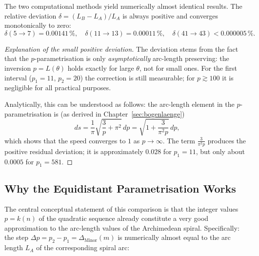 \begin{proposition}
\label{prop:methoden_uebereinstimmung}
The two computational methods yield numerically almost identical results.
The relative deviation $\delta = (L_B - L_A)/L_A$ is always positive and converges
monotonically to zero:
\[
\delta(5 \to 7) = 0.00141\,\%,\quad
\delta(11 \to 13) = 0.00011\,\%,\quad
\delta(41 \to 43) < 0.000005\,\%.
\]
\end{proposition}

\begin{proof}[Explanation of the small positive deviation]
The deviation stems from the fact that the $p$-parametrisation is only
\emph{asymptotically} arc-length preserving: the inversion $p = L(\theta)$
holds exactly for large $\theta$, not for small ones. For the first interval
($p_1 = 11$, $p_2 = 20$) the correction is still measurable; for
$p \gtrsim 100$ it is negligible for all practical purposes.

Analytically, this can be understood as follows: the arc-length element in the
$p$-parametrisation is (as derived in Chapter~\ref{sec:bogenlaenge})
\[
ds = \frac{1}{\pi}\sqrt{\frac{3}{p}+\pi^2}\,dp
   = \sqrt{1 + \frac{3}{\pi^2 p}}\,dp,
\]
which shows that the speed converges to $1$ as $p \to \infty$.
The term $\frac{3}{\pi^2 p}$ produces the positive residual deviation; it is
approximately $0.028$ for $p_1 = 11$, but only about $0.0005$ for $p_1 = 581$.
\end{proof}

\subsection{Why the Equidistant Parametrisation Works}

The central conceptual statement of this comparison is that the
integer values $p = k(n)$ of the quadratic sequence already constitute
a very good approximation to the arc-length values of the Archimedean
spiral. Specifically: the step $\Delta p = p_2 - p_1 = \Delta_{\mathrm{Minor}}(m)$
is numerically almost equal to the arc length $L_A$ of the corresponding
spiral arc:

